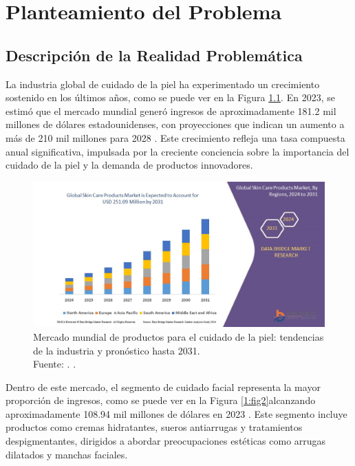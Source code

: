 \chapter{Planteamiento del Problema}
\section{Descripción de la Realidad Problemática}

La industria global de cuidado de la piel ha experimentado un crecimiento sostenido en los últimos años, como se puede ver en la Figura \ref{1:fig1}. En 2023, se estimó que el mercado mundial generó ingresos de aproximadamente 181.2 mil millones de dólares estadounidenses, con proyecciones que indican un aumento a más de 210 mil millones para 2028 . Este crecimiento refleja una tasa compuesta anual significativa, impulsada por la creciente conciencia sobre la importancia del cuidado de la piel y la demanda de productos innovadores. \parencite{databridge2024}

\begin{figure}[!ht]
	\begin{center}
		\includegraphics[width=1\textwidth]{1/figures/GlobalSkinCareProductsMarket.jpg}
		\caption[Mercado mundial de productos para el cuidado de la piel: tendencias de la industria y pronóstico hasta 2031]{Mercado mundial de productos para el cuidado de la piel: tendencias de la industria y pronóstico hasta 2031.\\
			Fuente: \cite{databridge2024}. .}
		\label{1:fig1}
	\end{center}
\end{figure}

Dentro de este mercado, el segmento de cuidado facial representa la mayor proporción de ingresos, como se puede ver en la Figura \ref{1:fig2}alcanzando aproximadamente 108.94 mil millones de dólares en 2023 . Este segmento incluye productos como cremas hidratantes, sueros antiarrugas y tratamientos despigmentantes, dirigidos a abordar preocupaciones estéticas como arrugas dilatados y manchas faciales. \parencite{statista2023segment}


